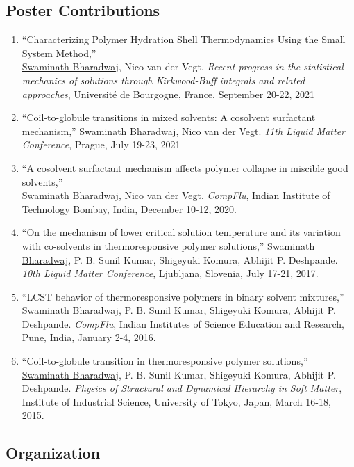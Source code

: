 \documentclass[a4paper,14pt]{article}
\begin{document}
\subsection*{\normalsize Poster Contributions}
\begin{enumerate}
\item
\enquote{Characterizing Polymer Hydration Shell Thermodynamics Using the Small
System Method,}\\  \underline{Swaminath Bharadwaj}, Nico van der Vegt.
\textit{Recent progress in the statistical mechanics of solutions through
Kirkwood-Buff integrals and related approaches}, Universit{\'e} de Bourgogne,
France, September 20-22, 2021
\item
\enquote{Coil-to-globule transitions in mixed solvents: A cosolvent surfactant
mechanism,} \underline{Swaminath Bharadwaj}, Nico van der Vegt. \textit{11th
Liquid Matter Conference}, Prague, July 19-23, 2021
\item
\enquote{A cosolvent surfactant mechanism affects polymer collapse in miscible
good solvents,}\\ \underline{Swaminath Bharadwaj}, Nico van der Vegt.
\textit{CompFlu}, Indian Institute of Technology Bombay, India, December 10-12,
2020.
\item
\enquote{On the mechanism of lower critical solution temperature and its
variation with co-solvents in thermoresponsive polymer
solutions,} \underline{Swaminath Bharadwaj}, P. B. Sunil Kumar, Shigeyuki
Komura, Abhijit P. Deshpande. \textit{10th Liquid Matter Conference}, Ljubljana,
Slovenia, July 17-21, 2017.
\item
\enquote{LCST behavior of thermoresponsive polymers in binary solvent
mixtures,} \underline{Swaminath Bharadwaj}, P. B. Sunil Kumar, Shigeyuki
Komura, Abhijit P. Deshpande. \textit{CompFlu}, Indian Institutes of Science
Education and Research, Pune, India, January 2-4, 2016.
\item
\enquote{Coil-to-globule transition in thermoresponsive polymer solutions,}
\underline{Swaminath Bharadwaj}, P. B. Sunil Kumar, Shigeyuki Komura, Abhijit
P. Deshpande. \textit{Physics of Structural and Dynamical Hierarchy in Soft
Matter}, Institute of Industrial Science, University of Tokyo, Japan, March
16-18, 2015.
\end{enumerate}
\subsection*{Organization}
\end{document}
